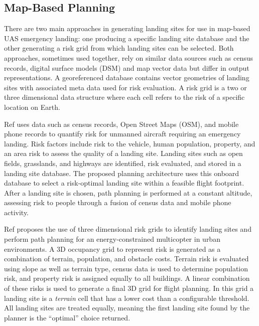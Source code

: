 
\subsection{Map-Based Planning}\label{sec:ch5_map_based_planning}

There are two main approaches in generating landing sites for use in map-based UAS emergency landing: one producing a specific landing site database and the other generating a risk grid from which landing sites can be selected. Both approaches, sometimes used together, rely on similar data sources such as census records, digital surface models (DSM) and map vector data but differ in output representations. A georeferenced database contains vector geometries of landing sites with associated meta data used for risk evaluation. A risk grid is a two or three dimensional data structure where each cell refers to the risk of a specific location on Earth.

Ref \cite{di_donato_evaluating_2017} uses data such as census records, Open Street Maps (OSM), and mobile phone records to quantify risk for unmanned aircraft requiring an emergency landing. Risk factors include risk to the vehicle, human population, property, and an area risk to assess the quality of a landing site. Landing sites such as open fields, grasslands, and highways are identified, risk evaluated, and stored in a landing site database. The proposed planning architecture uses this onboard database to select a risk-optimal landing site within a feasible flight footprint. After a landing site is chosen, path planning is performed at a constant altitude, assessing risk to people through a fusion of census data and mobile phone activity.

Ref \cite{ten_harmsel_emergency_2017} proposes the use of three dimensional risk grids to identify landing sites and perform path planning for an energy-constrained multicopter in urban environments. A 3D occupancy grid to represent risk is generated as a combination of terrain, population, and obstacle costs.  Terrain risk is evaluated using slope as well as terrain type, census data is used to determine population risk, and property risk is assigned equally to all buildings. A linear combination of these risks is used to generate a final 3D grid for flight planning. In this grid a landing site is a \emph{terrain} cell that has a lower cost than a configurable threshold. All landing sites are treated equally, meaning the first landing site found by the planner is the ``optimal'' choice returned.

